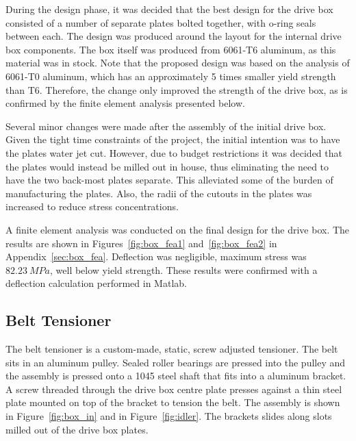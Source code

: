 During the design phase, it was decided that the best design for the drive box consisted of a number of separate plates bolted together, with o-ring seals between each. The design was produced around the layout for the internal drive box components. The box itself was produced from 6061-T6 aluminum, as this material was in stock. Note that the proposed design was based on the analysis of 6061-T0 aluminum, which has an approximately 5 times smaller yield  strength than T6. Therefore, the change only improved the strength of the drive box, as is confirmed by the finite element analysis presented below.

Several minor changes were made after the assembly of the initial drive box. Given the tight time constraints of the project, the initial intention was to have the plates water jet cut. However, due to budget restrictions it was decided that the plates would instead be milled out in house, thus eliminating the need to have the two back-most plates separate. This alleviated some of the burden of manufacturing the plates. Also, the radii of the cutouts in the plates was increased to reduce stress concentrations.

A finite element analysis was conducted on the final design for the drive box. The results are shown in Figures~\ref{fig:box_fea1} and~\ref{fig:box_fea2} in Appendix~\ref{sec:box_fea}. Deflection was negligible, maximum stress was ${82.23\ MPa}$, well below yield strength. These results were confirmed with a deflection calculation performed in Matlab.


\subsection{Belt Tensioner}

The belt tensioner is a custom-made, static, screw adjusted tensioner. The belt sits in an aluminum pulley. Sealed roller bearings are pressed into the pulley and the assembly is pressed onto a 1045 steel shaft that fits into a aluminum bracket. A screw threaded through the drive box centre plate presses against a thin steel plate mounted on top of the bracket to tension the belt. The assembly is shown in Figure~\ref{fig:box_in} and in Figure~\ref{fig:idler}. The brackets slides along slots milled out of the drive box plates.


